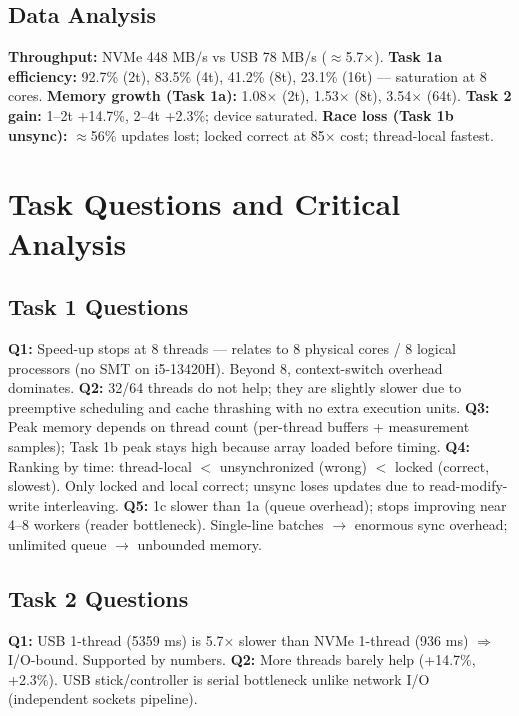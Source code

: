 \documentclass[12pt,a4paper]{article}
\begin{document}
\subsection{Data Analysis}
\label{sec:dataanalysis}
\textbf{Throughput:} NVMe 448 MB/s vs USB 78 MB/s ($\approx$5.7$\times$). \textbf{Task 1a efficiency:} 92.7\% (2t), 83.5\% (4t), 41.2\% (8t), 23.1\% (16t) --- saturation at 8 cores. \textbf{Memory growth (Task 1a):} 1.08$\times$ (2t), 1.53$\times$ (8t), 3.54$\times$ (64t). \textbf{Task 2 gain:} 1--2t +14.7\%, 2--4t +2.3\%; device saturated. \textbf{Race loss (Task 1b unsync):} $\approx$56\% updates lost; locked correct at 85$\times$ cost; thread-local fastest.

\section{Task Questions and Critical Analysis}

\subsection{Task 1 Questions}
\textbf{Q1:} Speed-up stops at 8 threads --- relates to 8 physical cores / 8 logical processors (no SMT on i5-13420H). Beyond 8, context-switch overhead dominates.
\textbf{Q2:} 32/64 threads do not help; they are slightly slower due to preemptive scheduling and cache thrashing with no extra execution units.
\textbf{Q3:} Peak memory depends on thread count (per-thread buffers + measurement samples); Task 1b peak stays high because array loaded before timing.
\textbf{Q4:} Ranking by time: thread-local $<$ unsynchronized (wrong) $<$ locked (correct, slowest). Only locked and local correct; unsync loses updates due to read-modify-write interleaving.
\textbf{Q5:} 1c slower than 1a (queue overhead); stops improving near 4--8 workers (reader bottleneck). Single-line batches $\to$ enormous sync overhead; unlimited queue $\to$ unbounded memory.

\subsection{Task 2 Questions}
\textbf{Q1:} USB 1-thread (5359 ms) is 5.7$\times$ slower than NVMe 1-thread (936 ms) $\Rightarrow$ I/O-bound. Supported by numbers.
\textbf{Q2:} More threads barely help (+14.7\%, +2.3\%). USB stick/controller is serial bottleneck unlike network I/O (independent sockets pipeline).
\end{document}
